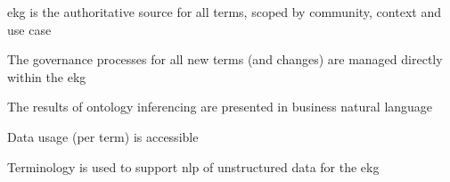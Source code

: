 \ekgmmscoringlevelFour

\begin{scoring}

  \item \gls{ekg} is the authoritative source for all terms, scoped by community, context and use case
  \item The governance processes for all new terms (and changes) are managed directly within the \gls{ekg}
  \item The results of ontology inferencing are presented in business natural language
  \item Data usage (per term) is accessible


\end{scoring}

\ekgmmscoringlevelFive

\begin{scoring}

  \item Terminology is used to support \gls{nlp} of unstructured data for the \gls{ekg}


\end{scoring}

